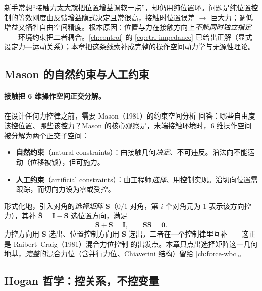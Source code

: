 \begin{pitfall}
新手常想“接触力太大就把位置增益调软一点”，却仍用纯位置环。问题是纯位置控制的等效刚度由反馈增益隐式决定且常很高，接触时位置误差 $\to$ 巨大力；调低增益又牺牲自由空间精度。根本原因：位置与力在接触方向上\emph{不能同时独立指定}——环境约束把二者耦合。\cref{ch:control} 的 \cref{eq:ctrl-impedance} 已给出正解（显式设定力—运动关系）；本章把这条线索补成完整的操作空间动力学与无源性理论。
\end{pitfall}

\subsection{Mason 的自然约束与人工约束}
\label{sec:os-mason}

\paragraph{接触把 6 维操作空间正交分解。}
在设计任何力控律之前，需要 Mason（1981）的约束空间分析\cite{mason1981compliance} 回答：哪些自由度该控位置、哪些该控力？Mason 的核心观察是，末端接触环境时，6 维操作空间被分解为两个正交子空间：
\begin{itemize}
  \item \textbf{自然约束}（natural constraints）：由接触几何\emph{决定}、不可违反。沿法向不能运动（位移被锁），但可施力。
  \item \textbf{人工约束}（artificial constraints）：由工程师\emph{选择}、用控制实现。沿切向位置需跟踪，而切向力设为零或受控。
\end{itemize}
形式化地，引入对角的\emph{选择矩阵} $\mathbf S$（$0/1$ 对角，第 $i$ 个对角元为 $1$ 表示该方向控力），其补 $\bar{\mathbf S}=\mathbf I-\mathbf S$ 选位置方向，满足
\begin{equation}
  \mathbf S+\bar{\mathbf S}=\mathbf I,\qquad \mathbf S\bar{\mathbf S}=\mathbf 0.
  \label{eq:os-selection}
\end{equation}
力控方向用 $\mathbf S$ 选出、位置控制方向用 $\bar{\mathbf S}$ 选出，二者在一个控制律里互补——这正是 Raibert--Craig（1981）混合力位控制\cite{raibert1981hybrid} 的出发点。本章只点出选择矩阵这一几何地基，\emph{完整}的混合力位（含并行力位、Chiaverini 结构）留给 \cref{ch:force-wbc}。

\subsection{Hogan 哲学：控关系，不控变量}
\label{sec:os-hogan}

